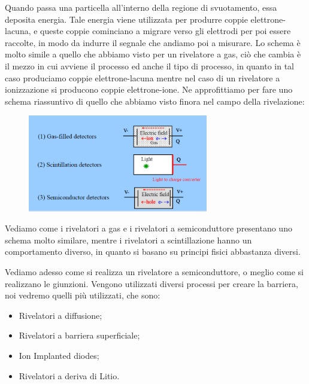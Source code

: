Quando passa una particella all'interno della regione di svuotamento, essa deposita energia. Tale energia viene utilizzata per produrre coppie elettrone-lacuna, e queste coppie cominciano a migrare verso gli elettrodi per poi essere raccolte, in modo da indurre il segnale che andiamo poi a misurare. Lo schema è molto simile a quello che abbiamo visto per un rivelatore a gas, ciò che cambia è il mezzo in cui avviene il processo ed anche il tipo di processo, in quanto in tal caso produciamo coppie elettrone-lacuna mentre nel caso di un rivelatore a ionizzazione si producono coppie elettrone-ione. Ne approfittiamo per fare uno schema riassuntivo di quello che abbiamo visto finora nel campo della rivelazione:
\begin{figure}[H]
   \centering
   \includegraphics[width=0.7\textwidth]{immagini/schema_rivelatori.png}
\end{figure}
Vediamo come i rivelatori a gas e i rivelatori a semiconduttore presentano uno schema molto similare, mentre i rivelatori a scintillazione hanno un comportamento diverso, in quanto si basano su principi fisici abbastanza diversi.

\vspace{0.2cm}Vediamo adesso come si realizza un rivelatore a semiconduttore, o meglio come si realizzano le giunzioni. Vengono utilizzati diversi processi per creare la barriera, noi vedremo quelli più utilizzati, che sono:

\begin{itemize}
   \item Rivelatori a diffusione;
   \item Rivelatori a barriera superficiale;
   \item Ion Implanted diodes;
   \item Rivelatori a deriva di Litio.
\end{itemize}

